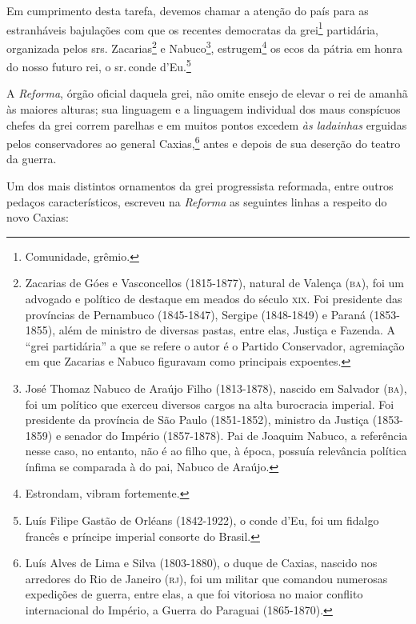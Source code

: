 Em cumprimento desta tarefa, devemos chamar a atenção do país para as
estranháveis bajulações com que os recentes democratas da
grei\footnote{Comunidade, grêmio.} partidária, organizada pelos srs.
Zacarias\footnote{Zacarias de Góes e Vasconcellos (1815-1877), natural
  de Valença (\textsc{ba}), foi um advogado e político de destaque em meados do
  século \textsc{xix}. Foi presidente das províncias de Pernambuco (1845-1847),
  Sergipe (1848-1849) e Paraná (1853-1855), além de ministro de diversas
  pastas, entre elas, Justiça e Fazenda. A ``grei partidária'' a que se
  refere o autor é o Partido Conservador, agremiação em que Zacarias e
  Nabuco figuravam como principais expoentes.} e Nabuco\footnote{José
  Thomaz Nabuco de Araújo Filho (1813-1878), nascido em Salvador (\textsc{ba}),
  foi um político que exerceu diversos cargos na alta burocracia
  imperial. Foi presidente da província de São Paulo (1851-1852),
  ministro da Justiça (1853-1859) e senador do Império (1857-1878). Pai
  de Joaquim Nabuco, a referência nesse caso, no entanto, não é ao filho
  que, à época, possuía relevância política ínfima se comparada à do
  pai, Nabuco de Araújo.}, estrugem\footnote{Estrondam, vibram
  fortemente.} os ecos da pátria em honra do nosso futuro rei, o sr.\,conde d'Eu.\footnote{Luís Filipe Gastão de Orléans (1842-1922), o conde
  d'Eu, foi um fidalgo francês e príncipe imperial consorte do Brasil.}

A \emph{Reforma}, órgão oficial daquela grei, não omite ensejo de elevar
o rei de amanhã às maiores alturas; sua linguagem e a linguagem
individual dos maus conspícuos chefes da grei correm parelhas e em
muitos pontos excedem \emph{às ladainhas} erguidas pelos conservadores
ao general Caxias,\footnote{Luís Alves de Lima e Silva (1803-1880), o
  duque de Caxias, nascido nos arredores do Rio de Janeiro (\textsc{rj}), foi um
  militar que comandou numerosas expedições de guerra, entre elas, a que
  foi vitoriosa no maior conflito internacional do Império, a Guerra do
  Paraguai (1865-1870).} antes e depois de sua deserção do teatro da
guerra.

Um dos mais distintos ornamentos da grei progressista reformada, entre
outros pedaços característicos, escreveu na \emph{Reforma} as seguintes
linhas a respeito do novo Caxias:


